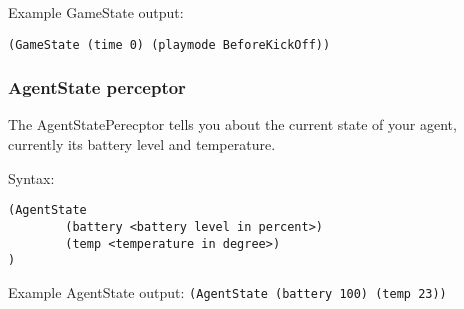 Example GameState output:

\texttt{(GameState (time 0) (playmode BeforeKickOff))}

\subsubsection{AgentState perceptor}

The AgentStatePerecptor tells you about the current state of your
agent, currently its battery level and temperature.

Syntax:
\begin{verbatim}
(AgentState
        (battery <battery level in percent>)
        (temp <temperature in degree>)
)
\end{verbatim}

Example AgentState output:
\texttt{(AgentState (battery 100) (temp 23))}






